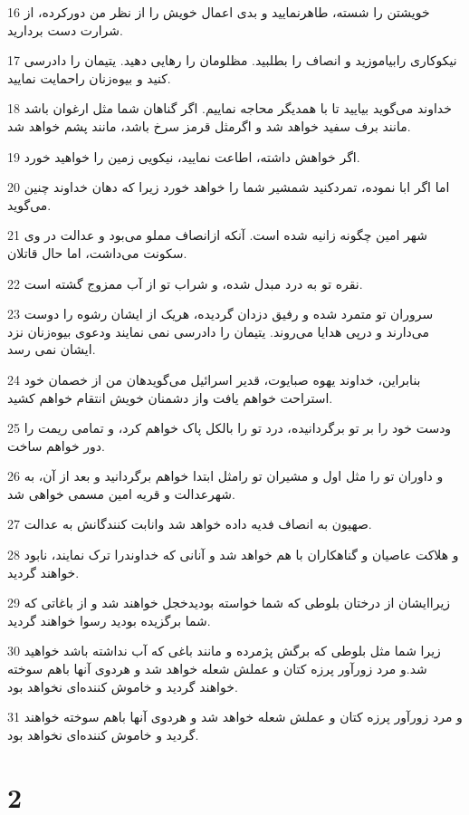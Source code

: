 \par 16 خویشتن را شسته، طاهرنمایید و بدی اعمال خویش را از نظر من دورکرده، از شرارت دست بردارید.
\par 17 نیکوکاری رابیاموزید و انصاف را بطلبید. مظلومان را رهایی دهید. یتیمان را دادرسی کنید و بیوه‌زنان راحمایت نمایید.
\par 18 خداوند می‌گوید بیایید تا با همدیگر محاجه نماییم. اگر گناهان شما مثل ارغوان باشد مانند برف سفید خواهد شد و اگرمثل قرمز سرخ باشد، مانند پشم خواهد شد.
\par 19 اگر خواهش داشته، اطاعت نمایید، نیکویی زمین را خواهید خورد.
\par 20 اما اگر ابا نموده، تمردکنید شمشیر شما را خواهد خورد زیرا که دهان خداوند چنین می‌گوید.
\par 21 شهر امین چگونه زانیه شده است. آنکه ازانصاف مملو می‌بود و عدالت در وی سکونت می‌داشت، اما حال قاتلان.
\par 22 نقره تو به درد مبدل شده، و شراب تو از آب ممزوج گشته است.
\par 23 سروران تو متمرد شده و رفیق دزدان گردیده، هریک از ایشان رشوه را دوست می‌دارند و در‌پی هدایا می‌روند. یتیمان را دادرسی نمی نمایند ودعوی بیوه‌زنان نزد ایشان نمی رسد.
\par 24 بنابراین، خداوند یهوه صبایوت، قدیر اسرائیل می‌گویدهان من از خصمان خود استراحت خواهم یافت واز دشمنان خویش انتقام خواهم کشید.
\par 25 ودست خود را بر تو برگردانیده، درد تو را بالکل پاک خواهم کرد، و تمامی ریمت را دور خواهم ساخت.
\par 26 و داوران تو را مثل اول و مشیران تو رامثل ابتدا خواهم برگردانید و بعد از آن، به شهرعدالت و قریه امین مسمی خواهی شد.
\par 27 صهیون به انصاف فدیه داده خواهد شد وانابت کنندگانش به عدالت.
\par 28 و هلاکت عاصیان و گناهکاران با هم خواهد شد و آنانی که خداوندرا ترک نمایند، نابود خواهند گردید.
\par 29 زیراایشان از درختان بلوطی که شما خواسته بودیدخجل خواهند شد و از باغاتی که شما برگزیده بودید رسوا خواهند گردید.
\par 30 زیرا شما مثل بلوطی که برگش پژمرده و مانند باغی که آب نداشته باشد خواهید شد.و مرد زورآور پرزه کتان و عملش شعله خواهد شد و هردوی آنها باهم سوخته خواهند گردید و خاموش کننده‌ای نخواهد بود.
\par 31 و مرد زورآور پرزه کتان و عملش شعله خواهد شد و هردوی آنها باهم سوخته خواهند گردید و خاموش کننده‌ای نخواهد بود.
 
\chapter{2}


